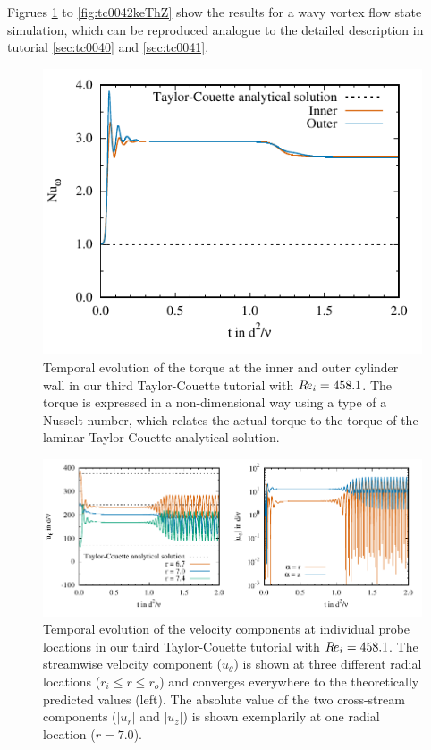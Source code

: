 \documentclass[a4paper, 11pt, DIV=11]{scrartcl}
\begin{document}
Figrues \ref{fig:tc0042torque} to \ref{fig:tc0042keThZ} show the results for
a wavy vortex flow state simulation, which can be reproduced analogue to the
detailed description in tutorial \ref{sec:tc0040} and \ref{sec:tc0041}.\begin{figure}[htb]
\centering
\includegraphics[scale=1.0]{figures/tc0042/torque}
\caption{Temporal evolution of the torque at the inner and outer cylinder
wall in our third Taylor-Couette tutorial  with $R\hspace{-0.1em}e_{i}=\num{458.1}$.
The torque is expressed in a non-dimensional way using a type of a Nusselt
number, which relates the actual torque to the torque of the laminar
Taylor-Couette analytical solution.}
\label{fig:tc0042torque}
\end{figure}
\begin{figure}[htb]
\centering
\includegraphics[scale=1.00]{figures/tc0042/probes}
\caption{Temporal evolution of the velocity components at individual probe 
locations in our third Taylor-Couette tutorial  with $R\hspace{-0.1em}e_{i}=\num{458.1}$.
The streamwise velocity component ($u_{\theta}$) is shown 
at three different radial locations ($r_{i}\le r\le r_{o}$) and converges 
everywhere to the theoretically predicted values (left). The absolute value of
the two cross-stream components ($|u_r|$ and $|u_z|$) is shown exemplarily at
one radial location ($r=\num{7.0}$).}
\label{fig:tc0042probes}
\end{figure}
\end{document}
